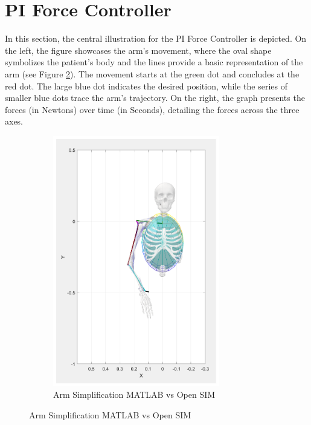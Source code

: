 \section{PI Force Controller}
In this section, the central illustration for the PI Force Controller is depicted. On the left, the figure showcases the arm's movement, where the oval shape symbolizes the patient's body and the lines provide a basic representation of the arm (see Figure \ref{fig:armsimplification}). The movement starts at the green dot and concludes at the red dot. The large blue dot indicates the desired position, while the series of smaller blue dots trace the arm's trajectory. On the right, the graph presents the forces (in Newtons) over time (in Seconds), detailing the forces across the three axes.

\begin{figure}[h!] 
    \centering
    \begin{subfigure}[b]{0.45\linewidth}
        \includegraphics[width=0.8\textwidth]{Pictures/Results/armbackground.png}
        \caption{Arm Simplification MATLAB vs Open SIM}
        \label{fig:armsimplification}

\end{subfigure}
\end{figure}
